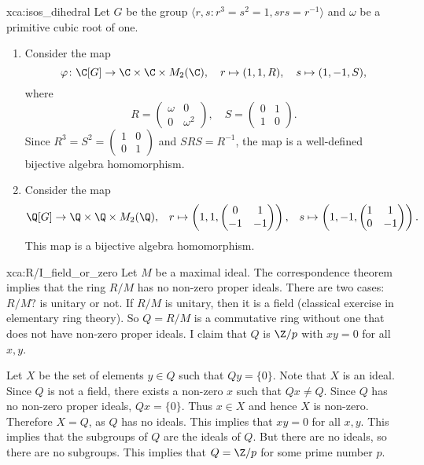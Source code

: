 \begin{sol}{xca:isos_dihedral}
Let $G$ be the group $\langle r,s:r^3=s^2=1,srs=r^{-1}\rangle$ 
and $\omega$ be a primitive cubic root of one. 
\begin{enumerate}
    \item Consider the map 
\[
\varphi\colon \C[G]\to \C\times \C\times M_2(\C),\quad 
r\mapsto (1,1,R),\quad 
s\mapsto (1,-1,S),
\]
where 
\[
R=\begin{pmatrix}
    \omega & 0\\
    0 & \omega^2
\end{pmatrix},\quad 
S=\begin{pmatrix}
    0 & 1 \\
    1 & 0
    \end{pmatrix}. 
\] 
Since $R^3=S^2=\begin{pmatrix}1&0\\0&1\end{pmatrix}$ and $SRS=R^{-1}$, the map 
is a well-defined bijective algebra homomorphism. 
\item Consider the map 
\begin{align*} 
\Q[G]\to\Q\times\Q\times M_2(\Q),&&
r\mapsto \left(1,1,\begin{pmatrix}0&1\\-1&-1\end{pmatrix}\right),&&
s\mapsto \left(1,-1,\begin{pmatrix}1&1\\0&-1\end{pmatrix}\right). 
\end{align*}
This map is a bijective algebra homomorphism. 
\end{enumerate}
\end{sol}

\begin{sol}{xca:R/I_field_or_zero}
Let $M$ be a maximal ideal. The correspondence theorem implies that the ring $R/M$ has no non-zero proper ideals. There are two cases: $R/M?$ is unitary or not. If $R/M$ is unitary, then it is a field (classical exercise in elementary ring theory). So $Q=R/M$ is a commutative ring without one that does not have non-zero proper ideals. I claim that $Q$ is $\Z/p$ with $xy=0$ for all $x,y$. 

Let $X$ be the set of elements $y\in Q$ such that $Qy=\{0\}$. Note that $X$ is an ideal. Since $Q$ is not a field, there exists a non-zero $x$ such that $Qx\ne Q$. Since $Q$ has no non-zero proper ideals, $Qx=\{0\}$. Thus $x\in X$ and hence $X$ is non-zero. Therefore $X=Q$, as $Q$ has no ideals. This implies that $xy=0$ for all $x,y$. This implies that the subgroups of $Q$ are the ideals of $Q$. But there are no ideals, so there are no subgroups. This implies that $Q =\Z/p$ for some prime number $p$.  
\end{sol}

